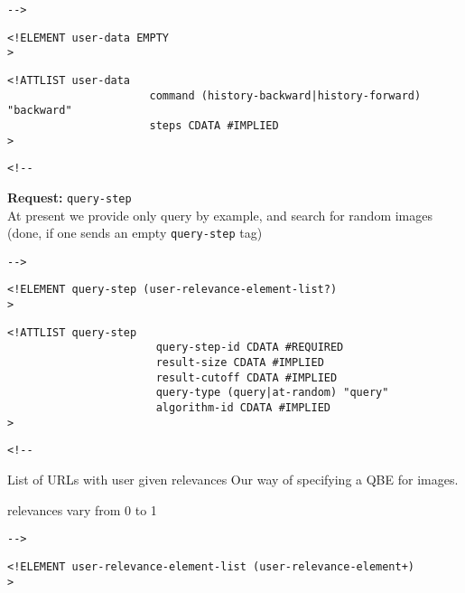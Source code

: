 \documentclass{article}
\newcommand{\requesttitle}[1]{\textbf{Request: }{\texttt{#1}}\\}
\newcommand{\tag}[1]{\texttt{#1}}
\begin{document}
 \begin{verbatim}-->\end{verbatim}



\begin{verbatim}
<!ELEMENT user-data EMPTY 
>\end{verbatim}

\begin{verbatim}
<!ATTLIST user-data 
                      command (history-backward|history-forward) "backward"
                      steps CDATA #IMPLIED
>\end{verbatim}

\begin{verbatim}<!--\end{verbatim}
  

     \requesttitle{query-step}

     At present we provide only query by example, and search for random
     images (done, if one sends an empty \tag{query-step} tag)


       
 \begin{verbatim}-->\end{verbatim}



\begin{verbatim}
<!ELEMENT query-step (user-relevance-element-list?) 
>\end{verbatim}

\begin{verbatim}
<!ATTLIST query-step 
                       query-step-id CDATA #REQUIRED
                       result-size CDATA #IMPLIED
                       result-cutoff CDATA #IMPLIED
                       query-type (query|at-random) "query"
                       algorithm-id CDATA #IMPLIED
>\end{verbatim}

\begin{verbatim}<!--\end{verbatim}
  List of URLs with user given relevances 
     Our way of specifying a QBE for images.

     relevances vary from 0 to 1
      
 \begin{verbatim}-->\end{verbatim}



\begin{verbatim}
<!ELEMENT user-relevance-element-list (user-relevance-element+) 
>\end{verbatim}
\end{document}
